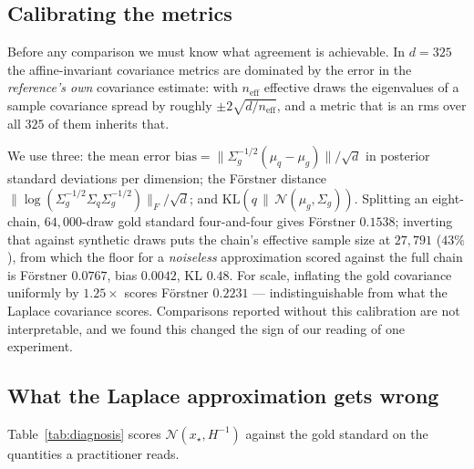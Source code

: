 \documentclass[11pt]{article}
\newcommand{\xmap}{x_{\star}}
\theoremstyle{plain}
\theoremstyle{definition}
\theoremstyle{remark}
\begin{document}
\subsection{Calibrating the metrics}
\label{sec:floors}

Before any comparison we must know what agreement is achievable. In $d = 325$ the affine-invariant
covariance metrics are dominated by the error in the \emph{reference's own} covariance estimate:
with $n_{\text{eff}}$ effective draws the eigenvalues of a sample covariance spread by roughly
$\pm 2\sqrt{d/n_{\text{eff}}}$, and a metric that is an rms over all $325$ of them inherits that.

We use three: the mean error $\text{bias} = \|\Sigma_g^{-1/2}(\mu_q-\mu_g)\|/\sqrt d$ in posterior
standard deviations per dimension; the F\"orstner distance
$\|\log(\Sigma_g^{-1/2}\Sigma_q\Sigma_g^{-1/2})\|_F/\sqrt d$; and $\mathrm{KL}(q\,\|\,\mathcal{N}(\mu_g,\Sigma_g))$.
Splitting an eight-chain, $64{,}000$-draw gold standard four-and-four gives F\"orstner $0.1538$;
inverting that against synthetic draws puts the chain's effective sample size at $27{,}791$
($43\%$), from which the floor for a \emph{noiseless} approximation scored against the full chain is
F\"orstner $0.0767$, bias $0.0042$, KL $0.48$. For scale, inflating the gold covariance uniformly by
$1.25\times$ scores F\"orstner $0.2231$ --- indistinguishable from what the Laplace covariance
scores. Comparisons reported without this calibration are not interpretable, and we found this
changed the sign of our reading of one experiment.

\subsection{What the Laplace approximation gets wrong}

Table~\ref{tab:diagnosis} scores $\mathcal{N}(\xmap, H^{-1})$ against the gold standard on the
quantities a practitioner reads.
\end{document}
